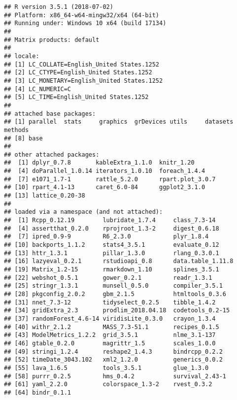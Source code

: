 \documentclass[]{article}
\begin{document}
\begin{verbatim}
## R version 3.5.1 (2018-07-02)
## Platform: x86_64-w64-mingw32/x64 (64-bit)
## Running under: Windows 10 x64 (build 17134)
## 
## Matrix products: default
## 
## locale:
## [1] LC_COLLATE=English_United States.1252 
## [2] LC_CTYPE=English_United States.1252   
## [3] LC_MONETARY=English_United States.1252
## [4] LC_NUMERIC=C                          
## [5] LC_TIME=English_United States.1252    
## 
## attached base packages:
## [1] parallel  stats     graphics  grDevices utils     datasets  methods  
## [8] base     
## 
## other attached packages:
##  [1] dplyr_0.7.8       kableExtra_1.1.0  knitr_1.20       
##  [4] doParallel_1.0.14 iterators_1.0.10  foreach_1.4.4    
##  [7] e1071_1.7-1       rattle_5.2.0      rpart.plot_3.0.7 
## [10] rpart_4.1-13      caret_6.0-84      ggplot2_3.1.0    
## [13] lattice_0.20-38  
## 
## loaded via a namespace (and not attached):
##  [1] Rcpp_0.12.19        lubridate_1.7.4     class_7.3-14       
##  [4] assertthat_0.2.0    rprojroot_1.3-2     digest_0.6.18      
##  [7] ipred_0.9-9         R6_2.3.0            plyr_1.8.4         
## [10] backports_1.1.2     stats4_3.5.1        evaluate_0.12      
## [13] httr_1.3.1          pillar_1.3.0        rlang_0.3.0.1      
## [16] lazyeval_0.2.1      rstudioapi_0.8      data.table_1.11.8  
## [19] Matrix_1.2-15       rmarkdown_1.10      splines_3.5.1      
## [22] webshot_0.5.1       gower_0.2.1         readr_1.3.1        
## [25] stringr_1.3.1       munsell_0.5.0       compiler_3.5.1     
## [28] pkgconfig_2.0.2     gbm_2.1.5           htmltools_0.3.6    
## [31] nnet_7.3-12         tidyselect_0.2.5    tibble_1.4.2       
## [34] gridExtra_2.3       prodlim_2018.04.18  codetools_0.2-15   
## [37] randomForest_4.6-14 viridisLite_0.3.0   crayon_1.3.4       
## [40] withr_2.1.2         MASS_7.3-51.1       recipes_0.1.5      
## [43] ModelMetrics_1.2.2  grid_3.5.1          nlme_3.1-137       
## [46] gtable_0.2.0        magrittr_1.5        scales_1.0.0       
## [49] stringi_1.2.4       reshape2_1.4.3      bindrcpp_0.2.2     
## [52] timeDate_3043.102   xml2_1.2.0          generics_0.0.2     
## [55] lava_1.6.5          tools_3.5.1         glue_1.3.0         
## [58] purrr_0.2.5         hms_0.4.2           survival_2.43-1    
## [61] yaml_2.2.0          colorspace_1.3-2    rvest_0.3.2        
## [64] bindr_0.1.1
\end{verbatim}
\end{document}
